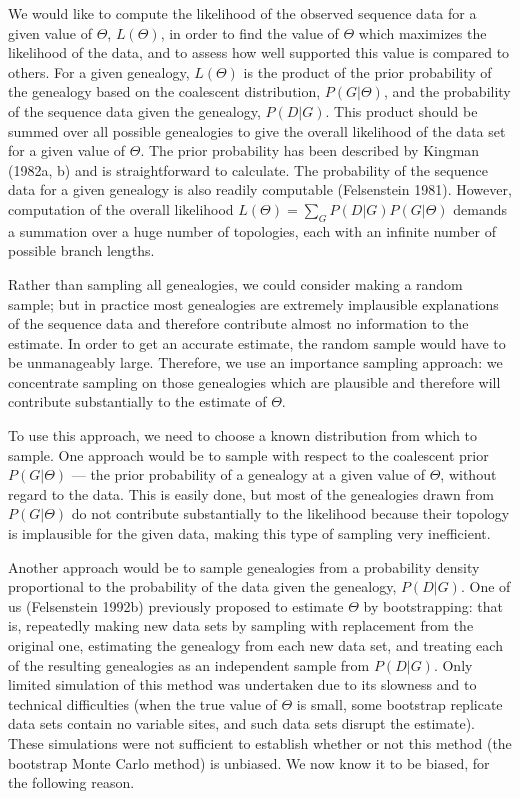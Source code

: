 \documentclass[12pt]{article}
\begin{document}
We would like to compute the likelihood of the observed sequence data for 
a given value of $\Theta$, $L(\Theta)$, in order to find the value of
$\Theta$ which maximizes the likelihood of the data, and to assess how
well supported this value is compared to others.  For a given genealogy, 
$L(\Theta)$ is the product
of the prior probability of the genealogy based on the coalescent distribution,
$P(G|\Theta)$, and the probability of the sequence data given the
genealogy, $P(D|G)$.  This product should be summed over all possible
genealogies to give the overall likelihood of the data set for a given
value of $\Theta$.
The prior probability has been described by {\sc Kingman} (1982a, b) and is
straightforward to calculate.  The probability of the sequence data for
a given genealogy is also readily computable ({\sc Felsenstein}
1981).  However, computation of the overall likelihood $L(\Theta)=\sum_{G}P(D|G)P(G|\Theta)$ 
demands a summation over a huge number of topologies, each with an
infinite number of possible branch lengths.

Rather than sampling all genealogies, we could consider making a random sample;
but in practice most genealogies are extremely implausible explanations
of the sequence data and therefore contribute almost no
information to the estimate.  In order to get an accurate estimate,
the random sample would have to be unmanageably large.  Therefore, we use an
importance sampling approach:  we concentrate sampling on those
genealogies which are plausible and therefore will contribute
substantially to the estimate of $\Theta$.  

To use this approach,
we need to choose a known distribution from which to sample.
One approach would be to sample with respect to
the coalescent prior $P(G|\Theta)$ --- the prior probability of a genealogy
at a given value of $\Theta$, without regard to the data.  This is easily 
done, but most of the genealogies drawn from $P(G|\Theta)$ do not 
contribute substantially to
the likelihood because their topology is implausible for the
given data, making this type of sampling very inefficient.

Another
approach would be to sample genealogies from a probability density
proportional to the probability of the data
given the genealogy, $P(D|G)$.
One of us ({\sc Felsenstein} 1992b) previously proposed to estimate $\Theta$
by bootstrapping:  that is, repeatedly making new data sets by
sampling with replacement from the original one, estimating the
genealogy from each new data set, and treating each of the resulting 
genealogies as an
independent sample from $P(D|G)$.  Only limited simulation of this method
was undertaken due to its slowness and to technical difficulties (when
the true value of 
$\Theta$ is small, some bootstrap replicate data sets contain no variable
sites, and such data sets disrupt the estimate).  These simulations
were not sufficient to establish whether or not this method (the bootstrap Monte
Carlo method) is unbiased.  We now know it to be biased, for the
following reason.
\end{document}
